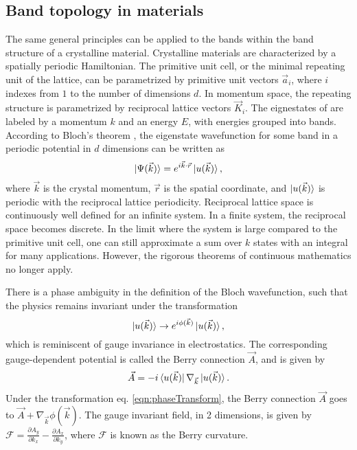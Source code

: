 \subsection{Band topology in materials}
The same general principles can be applied to the bands within the band structure of a crystalline material\cite{FranzMolenkamp}. Crystalline materials are characterized by a spatially periodic Hamiltonian. The primitive unit cell, or the minimal repeating unit of the lattice, can be parametrized by primitive unit vectors $\vec{a}_i$, where $i$ indexes from $1$ to the number of dimensions $d$. In momentum space, the repeating structure is parametrized by reciprocal lattice vectors $\vec{K}_i$. The eignestates of are labeled by a momentum $k$ and an energy $E$, with energies grouped into bands. According to Bloch's theorem \cite{Ashcroft}, the eigenstate wavefunction for some band in a periodic potential in $d$ dimensions can be written as 
\begin{equation}
\mathinner{|{\Psi(\vec{k})}\rangle} = e^{i\vec{k}\cdot\vec{r}}\mathinner{|{u(\vec{k})}\rangle},
\end{equation}
where $\vec{k}$ is the crystal momentum, $\vec{r}$ is the spatial coordinate, and $\mathinner{|{u(\vec{k})}\rangle}$ is periodic with the reciprocal lattice periodicity. Reciprocal lattice space is continuously well defined for an infinite system. In a finite system, the reciprocal space becomes discrete. In the limit where the system is large compared to the primitive unit cell, one can still approximate a sum over $k$ states with an integral for many applications. However, the rigorous theorems of continuous mathematics no longer apply. 

There is a phase ambiguity in the definition of the Bloch wavefunction, such that the physics remains invariant under the transformation\cite{FranzMolenkamp}
\begin{equation}
\mathinner{|{u(\vec{k})}\rangle} \rightarrow e^{i\phi(\vec{k})}\mathinner{|{u(\vec{k})}\rangle},
\label{eqn:phaseTransform}
\end{equation}
which is reminiscent of gauge invariance in electrostatics. The corresponding gauge-dependent potential is called the Berry connection $\vec{A}$, and is given by 
\begin{equation}
\vec{A}=-i\mathinner{\langle{u(\vec{k})}|}\nabla_{\vec{k}}\mathinner{|{u(\vec{k})}\rangle}.
\end{equation}
Under the transformation eq. \ref{eqn:phaseTransform}, the Berry connection $\vec{A}$ goes to $\vec{A} + \nabla_{\vec{k}}\phi(\vec{k})$. The gauge invariant field, in 2 dimensions, is given by $\mathcal{F}=\frac{\partial A_y}{\partial k_x} - \frac{\partial A_x}{\partial k_y}$, where $\mathcal{F}$ is known as the Berry curvature. 

